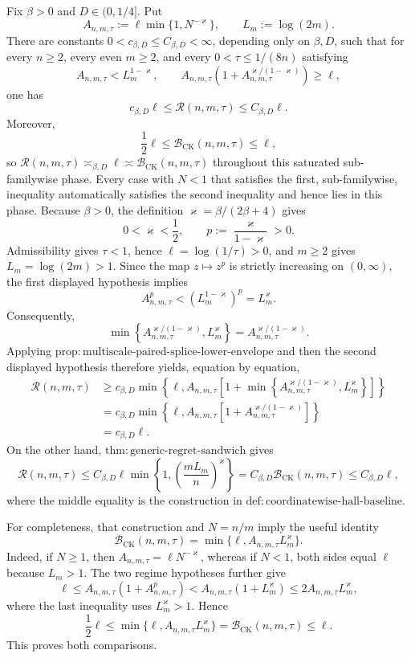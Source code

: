 Fix \(\beta>0\) and \(D\in(0,1/4]\). Put
\[
A_{n,m,\tau}:=\ell\min\{1,N^{-\varkappa}\},
\qquad L_m:=\log(2m).
\]
There are constants \(0<c_{\beta,D}\le C_{\beta,D}<\infty\), depending only on \(\beta,D\), such that for every \(n\ge2\), every even \(m\ge2\), and every \(0<\tau\le1/(8n)\) satisfying
\[
A_{n,m,\tau}<L_m^{1-\varkappa},
\qquad
A_{n,m,\tau}\left(1+A_{n,m,\tau}^{\varkappa/(1-\varkappa)}\right)\ge\ell,
\]
one has
\[
c_{\beta,D}\ell
\le \mathcal R(n,m,\tau)
\le C_{\beta,D}\ell.
\]
Moreover,
\[
\frac12\ell\le \mathcal B_{\mathrm{CK}}(n,m,\tau)\le\ell,
\]
so \(\mathcal R(n,m,\tau)\asymp_{\beta,D}\ell\asymp\mathcal B_{\mathrm{CK}}(n,m,\tau)\) throughout this saturated sub-familywise phase. Every case with \(N<1\) that satisfies the first, sub-familywise, inequality automatically satisfies the second inequality and hence lies in this phase.
Because \(\beta>0\), the definition \(\varkappa=\beta/(2\beta+4)\) gives
\[
0<\varkappa<\frac12,
\qquad
p:=\frac{\varkappa}{1-\varkappa}>0.
\]
Admissibility gives \(\tau<1\), hence \(\ell=\log(1/\tau)>0\), and \(m\ge2\) gives \(L_m=\log(2m)>1\). Since the map \(z\mapsto z^p\) is strictly increasing on \((0,\infty)\), the first displayed hypothesis implies
\[
A_{n,m,\tau}^{p}
<\left(L_m^{1-\varkappa}\right)^p
=L_m^{\varkappa}.
\]
Consequently,
\[
\min\left\{A_{n,m,\tau}^{\varkappa/(1-\varkappa)},L_m^{\varkappa}\right\}
=A_{n,m,\tau}^{\varkappa/(1-\varkappa)}.
\]
Applying \(\mathrm{prop{:}multiscale\text{-}paired\text{-}splice\text{-}lower\text{-}envelope}\) and then the second displayed hypothesis therefore yields, equation by equation,
\[
\begin{aligned}
\mathcal R(n,m,\tau)
&\ge c_{\beta,D}\min\!\left\{\ell,
A_{n,m,\tau}\left[1+
\min\!\left\{A_{n,m,\tau}^{\varkappa/(1-\varkappa)},L_m^{\varkappa}\right\}\right]\right\}\\
&=c_{\beta,D}\min\!\left\{\ell,
A_{n,m,\tau}\left[1+A_{n,m,\tau}^{\varkappa/(1-\varkappa)}\right]\right\}\\
&=c_{\beta,D}\ell.
\end{aligned}
\]
On the other hand, \(\mathrm{thm{:}generic\text{-}regret\text{-}sandwich}\) gives
\[
\mathcal R(n,m,\tau)
\le C_{\beta,D}\ell
\min\left\{1,\left(\frac{mL_m}{n}\right)^{\varkappa}\right\}
=C_{\beta,D}\mathcal B_{\mathrm{CK}}(n,m,\tau)
\le C_{\beta,D}\ell,
\]
where the middle equality is the construction in \(\mathrm{def{:}coordinatewise\text{-}hall\text{-}baseline}\).

For completeness, that construction and \(N=n/m\) imply the useful identity
\[
\mathcal B_{\mathrm{CK}}(n,m,\tau)
=\min\{\ell,A_{n,m,\tau}L_m^{\varkappa}\}.
\]
Indeed, if \(N\ge1\), then \(A_{n,m,\tau}=\ell N^{-\varkappa}\), whereas if \(N<1\), both sides equal \(\ell\) because \(L_m>1\). The two regime hypotheses further give
\[
\ell
\le A_{n,m,\tau}\left(1+A_{n,m,\tau}^{p}\right)
<A_{n,m,\tau}(1+L_m^{\varkappa})
\le2A_{n,m,\tau}L_m^{\varkappa},
\]
where the last inequality uses \(L_m^{\varkappa}>1\). Hence
\[
\frac12\ell
\le\min\{\ell,A_{n,m,\tau}L_m^{\varkappa}\}
=\mathcal B_{\mathrm{CK}}(n,m,\tau)
\le\ell.
\]
This proves both comparisons.

